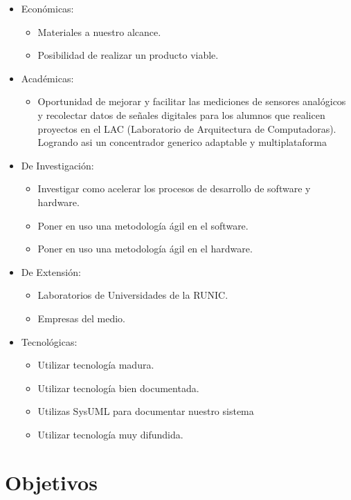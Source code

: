 \begin{itemize}
	\item Económicas:
	    \begin{itemize}
	        \item Materiales a nuestro alcance.
	        \item Posibilidad de realizar un producto viable.
	    \end{itemize}
	\item Académicas:
	    \begin{itemize}
	        \item Oportunidad de mejorar y facilitar las mediciones de sensores analógicos y recolectar datos de señales digitales para los alumnos que realicen proyectos en el LAC (Laboratorio de Arquitectura de Computadoras). Logrando asi un concentrador generico adaptable y multiplataforma
	    \end{itemize}
	\item De Investigación:
	    \begin{itemize}
	        \item Investigar como acelerar los procesos de desarrollo de software y hardware.
	        \item Poner en uso una metodología ágil en el software.
	        \item Poner en uso una metodología ágil en el hardware.
	    \end{itemize}
	\item De Extensión:
	    \begin{itemize}
	        \item Laboratorios de Universidades de la RUNIC.
	        \item Empresas del medio.
	    \end{itemize}
	\item Tecnológicas:
	    \begin{itemize}
	        \item Utilizar tecnología madura.
	        \item Utilizar tecnología bien documentada.
	        \item Utilizas SysUML para documentar nuestro sistema
	        \item Utilizar tecnología muy difundida.
	    \end{itemize}
\end{itemize}


\section{Objetivos} %
\label{sec:objetivos}

